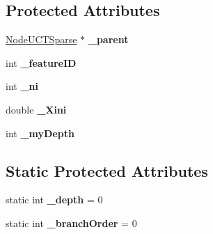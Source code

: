 \subsection*{Protected Attributes}
\begin{DoxyCompactItemize}
\item 
\hypertarget{classMultiBoost_1_1NodeUCTSparse_a196bc201d3bb99ee97c300fc2a5f7ba4}{\hyperlink{classMultiBoost_1_1NodeUCTSparse}{Node\-U\-C\-T\-Sparse} $\ast$ {\bfseries \-\_\-parent}}\label{classMultiBoost_1_1NodeUCTSparse_a196bc201d3bb99ee97c300fc2a5f7ba4}

\item 
\hypertarget{classMultiBoost_1_1NodeUCTSparse_a52aff0019a4d1d5b4175137ac1e5c79e}{int {\bfseries \-\_\-feature\-I\-D}}\label{classMultiBoost_1_1NodeUCTSparse_a52aff0019a4d1d5b4175137ac1e5c79e}

\item 
\hypertarget{classMultiBoost_1_1NodeUCTSparse_a3fd21c96d8ba30e4e9761b05f73c5209}{int {\bfseries \-\_\-ni}}\label{classMultiBoost_1_1NodeUCTSparse_a3fd21c96d8ba30e4e9761b05f73c5209}

\item 
\hypertarget{classMultiBoost_1_1NodeUCTSparse_ac1214966188530e2699af3f4c5175cd7}{double {\bfseries \-\_\-\-Xini}}\label{classMultiBoost_1_1NodeUCTSparse_ac1214966188530e2699af3f4c5175cd7}

\item 
\hypertarget{classMultiBoost_1_1NodeUCTSparse_aa069be2e0bbff09a798334f1d9b612a3}{int {\bfseries \-\_\-my\-Depth}}\label{classMultiBoost_1_1NodeUCTSparse_aa069be2e0bbff09a798334f1d9b612a3}

\end{DoxyCompactItemize}
\subsection*{Static Protected Attributes}
\begin{DoxyCompactItemize}
\item 
\hypertarget{classMultiBoost_1_1NodeUCTSparse_a4403071a5e5e157cad4c5082b9003dee}{static int {\bfseries \-\_\-depth} = 0}\label{classMultiBoost_1_1NodeUCTSparse_a4403071a5e5e157cad4c5082b9003dee}

\item 
\hypertarget{classMultiBoost_1_1NodeUCTSparse_ab910316c6b2bd4b4c9d7571c13307fdb}{static int {\bfseries \-\_\-branch\-Order} = 0}\label{classMultiBoost_1_1NodeUCTSparse_ab910316c6b2bd4b4c9d7571c13307fdb}

\end{DoxyCompactItemize}


